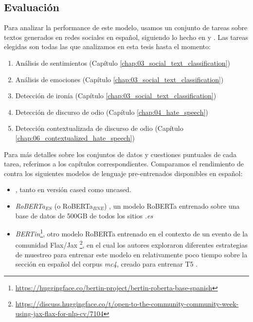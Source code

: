 \subsection{Evaluación}

Para analizar la performance de este modelo, usamos un conjunto de tareas sobre textos generados en redes sociales en español, siguiendo lo hecho en \citet{gonzalez2021twilbert} y \citet{polignano2019alberto}. Las tareas elegidas son todas las que analizamos en esta tesis hasta el momento:

\begin{enumerate}
    \item Análisis de sentimientos (Capítulo \ref{chap:03_social_text_classification})
    \item Análisis de emociones (Capítulo \ref{chap:03_social_text_classification})
    \item Detección de ironía (Capítulo \ref{chap:03_social_text_classification})
    \item Detección de discurso de odio (Capítulo \ref{chap:04_hate_speech})
    \item Detección contextualizada de discurso de odio (Capítulo \ref{chap:06_contextualized_hate_speech})
\end{enumerate}


Para más detalles sobre los conjuntos de datos y cuestiones puntuales de cada tarea, referimos a los capítulos correspondientes. Comparamos el rendimiento de \robertuito{} contra los siguientes modelos de lenguaje pre-entrenados disponibles en español:

\begin{itemize}
    \item \beto{} \cite{canete2020spanish}, tanto en versión cased como uncased.
    \item \emph{RoBERTa$_{ES}$} (o RoBERTa$_{BNE}$) \cite{gutierrezfandino2021spanish}, un modelo RoBERTa entrenado sobre una base de datos de 500GB de todos los sitios \emph{.es}
    \item \emph{BERTin}\footnote{\url{https://huggingface.co/bertin-project/bertin-roberta-base-spanish}}, otro modelo RoBERTa entrenado en el contexto de un evento de la comunidad Flax/Jax \footnote{\url{https://discuss.huggingface.co/t/open-to-the-community-community-week-using-jax-flax-for-nlp-cv/7104}}, en el cual los autores exploraron diferentes estrategias de muestreo para entrenar este modelo en relativamente poco tiempo sobre la sección en español del corpus \emph{mc4}, creado para entrenar T5 \cite{raffel2020exploringt5}.
\end{itemize}

